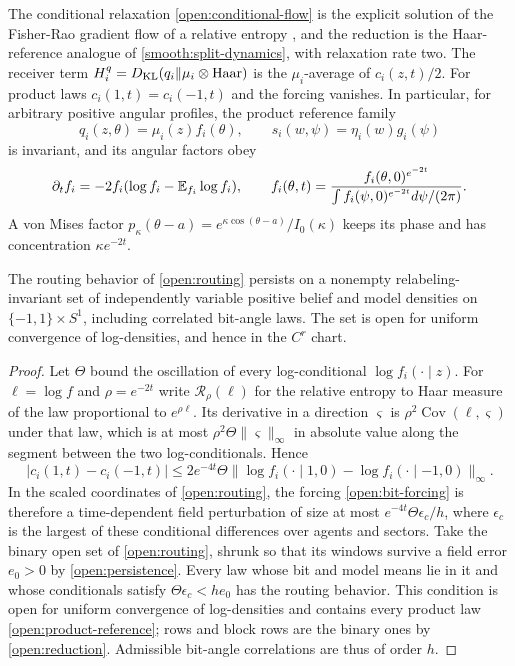 The conditional relaxation \cref{open:conditional-flow} is the explicit solution of the Fisher-Rao gradient flow of a relative entropy \citep{ChenEtAl2023}, and the reduction is the Haar-reference analogue of \cref{smooth:split-dynamics}, with relaxation rate two. The receiver term $H_i^q=D_{\mathrm{KL}}(q_i\|\mu_i\otimes\mathrm{Haar})$ is the $\mu_i$-average of $c_i(z,t)/2$. For product laws $c_i(1,t)=c_i(-1,t)$ and the forcing vanishes. In particular, for arbitrary positive angular profiles, the product reference family
\begin{equation}
q_i(z,\theta)=\mu_i(z)f_i(\theta),\qquad
s_i(w,\psi)=\eta_i(w)g_i(\psi)
\label{open:product-reference}
\end{equation}
is invariant, and its angular factors obey
\begin{equation}
\partial_tf_i=-2f_i(\log f_i-\mathbb E_{f_i}\log f_i),
\qquad
f_i(\theta,t)=
\frac{f_i(\theta,0)^{e^{-2t}}}
{\int f_i(\psi,0)^{e^{-2t}}d\psi/(2\pi)}.
\label{open:angular-flow}
\end{equation}
A von Mises factor $p_\kappa(\theta-a)=e^{\kappa\cos(\theta-a)}/I_0(\kappa)$ keeps its phase and has concentration $\kappa e^{-2t}$.

The routing behavior of \cref{open:routing} persists on a nonempty relabeling-invariant set of independently variable positive belief and model densities on $\{-1,1\}\times S^1$, including correlated bit-angle laws. The set is open for uniform convergence of log-densities, and hence in the $C^r$ chart.
\begin{proof}
Let $\Theta$ bound the oscillation of every log-conditional $\log f_i(\cdot\mid z)$. For $\ell=\log f$ and $\rho=e^{-2t}$ write $\mathcal R_\rho(\ell)$ for the relative entropy to Haar measure of the law proportional to $e^{\rho\ell}$. Its derivative in a direction $\varsigma$ is $\rho^2\operatorname{Cov}(\ell,\varsigma)$ under that law, which is at most $\rho^2\Theta\|\varsigma\|_\infty$ in absolute value along the segment between the two log-conditionals. Hence
\begin{equation}
|c_i(1,t)-c_i(-1,t)|\le2e^{-4t}\Theta\bigl\|\log f_i(\cdot\mid1,0)-\log f_i(\cdot\mid-1,0)\bigr\|_\infty.
\end{equation}
In the scaled coordinates of \cref{open:routing}, the forcing \cref{open:bit-forcing} is therefore a time-dependent field perturbation of size at most $e^{-4t}\Theta\epsilon_c/h$, where $\epsilon_c$ is the largest of these conditional differences over agents and sectors. Take the binary open set of \cref{open:routing}, shrunk so that its windows survive a field error $e_0>0$ by \cref{open:persistence}. Every law whose bit and model means lie in it and whose conditionals satisfy $\Theta\epsilon_c<he_0$ has the routing behavior. This condition is open for uniform convergence of log-densities and contains every product law \cref{open:product-reference}; rows and block rows are the binary ones by \cref{open:reduction}. Admissible bit-angle correlations are thus of order $h$.
\end{proof}

